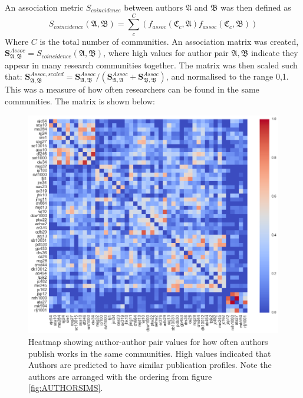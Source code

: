 An association metric $S_{coincidence}$ between authors $\mathfrak{A}$ and $\mathfrak{B}$ was then defined as $$S_{coincidence}\left( \mathfrak{A} , \mathfrak{B} \right) = \sum_c^C \left(f_{assoc} \left( \mathfrak{C}_c , \mathfrak{A} \right) f_{assoc}\left( \mathfrak{C}_c , \mathfrak{B} \right) \right) $$
Where $C$ is the total number of communities. An association matrix was created, $\mathbf{S}^{Assoc}_{\mathfrak{A} , \mathfrak{B}} = S_{coincidence}\left( \mathfrak{A} , \mathfrak{B} \right)$, where high values for author pair $\mathfrak{A} , \mathfrak{B}$ indicate they appear in many research communities together. The matrix was then scaled such that: $\mathbf{S}^{Assoc,scaled}_{\mathfrak{A} , \mathfrak{B}} =  \mathbf{S}^{Assoc}_{\mathfrak{A} , \mathfrak{B}} /  \left( \mathbf{S}^{Assoc}_{\mathfrak{A} , \mathfrak{A}} + \mathbf{S}^{Assoc}_{\mathfrak{B} , \mathfrak{B}} \right) $, and normalised to the range 0,1. This was a measure of how often researchers can be found in the same communities. The matrix is shown below:
\begin{center}
\begin{figure}[H]
\label{fig:commHEATMAP}
  \centering
    \includegraphics[width=\textwidth]{Analysis/author_comm_heatmap.png}
    \caption{Heatmap showing author-author pair values for how often authors publish works in the same communities. High values indicated that Authors are predicted to have similar publication profiles. Note the authors are arranged with the ordering from figure \ref{fig:AUTHORSIMS}.}
\end{figure} 
\end{center}
